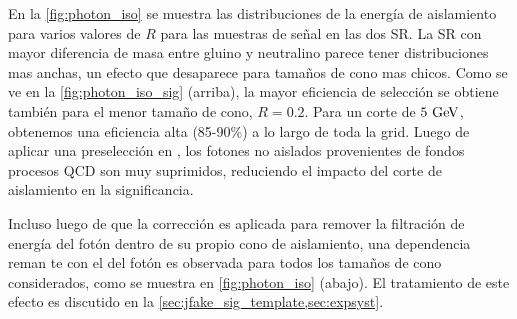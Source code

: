 En la \cref{fig:photon_iso} se muestra las distribuciones de la energía de
aislamiento para varios valores de $R$ para las muestras de señal en las dos SR.
La SR con mayor diferencia de masa entre gluino y neutralino parece tener
distribuciones mas anchas, un efecto que desaparece para tamaños de cono mas
chicos. Como se ve en la \cref{fig:photon_iso_sig} (arriba), la mayor eficiencia
de selección se obtiene también para el menor tamaño de cono, $R = 0.2$. Para un
corte de $5 \GeV$, obtenemos una eficiencia alta (85-90\%) a lo largo de toda la
grid. Luego de aplicar una preselección en {\met}, los fotones no aislados
provenientes de fondos procesos QCD son muy suprimidos, reduciendo el impacto
del corte de aislamiento en la significancia.

Incluso luego de que la corrección es aplicada para remover la filtración de
energía del fotón dentro de su propio cono de aislamiento, una dependencia reman
te con el {\pt} del fotón es observada para todos los tamaños de cono
considerados, como se muestra en \cref{fig:photon_iso} (abajo). El tratamiento
de este efecto es discutido en la \cref{sec:jfake_sig_template,sec:expsyst}.


